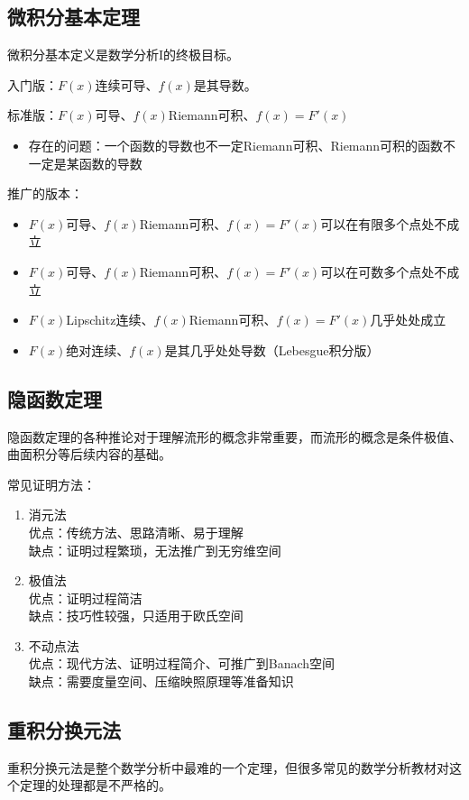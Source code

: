\documentclass[UTF8]{article}
\begin{document}
    \subsection{微积分基本定理}
    微积分基本定义是数学分析I的终极目标。

    入门版：$F(x)$连续可导、$f(x)$是其导数。

    标准版：$F(x)$可导、$f(x)$Riemann可积、$f(x)=F'(x)$
    \begin{itemize}
        \item 存在的问题：一个函数的导数也不一定Riemann可积、Riemann可积的函数不一定是某函数的导数
    \end{itemize}
    推广的版本：\begin{itemize}
        \item $F(x)$可导、$f(x)$Riemann可积、$f(x)=F'(x)$可以在有限多个点处不成立
        \item $F(x)$可导、$f(x)$Riemann可积、$f(x)=F'(x)$可以在可数多个点处不成立
        \item $F(x)$Lipschitz连续、$f(x)$Riemann可积、$f(x)=F'(x)$几乎处处成立
        \item $F(x)$绝对连续、$f(x)$是其几乎处处导数（Lebesgue积分版）
    \end{itemize}
    \subsection{隐函数定理}
    隐函数定理的各种推论对于理解流形的概念非常重要，而流形的概念是条件极值、曲面积分等后续内容的基础。

    常见证明方法：\begin{enumerate}
        \item 消元法\\ 优点：传统方法、思路清晰、易于理解\\ 缺点：证明过程繁琐，无法推广到无穷维空间
        \item 极值法\\ 优点：证明过程简洁\\ 缺点：技巧性较强，只适用于欧氏空间
        \item 不动点法\\ 优点：现代方法、证明过程简介、可推广到Banach空间\\ 缺点：需要度量空间、压缩映照原理等准备知识
    \end{enumerate}
    \subsection{重积分换元法}
    重积分换元法是整个数学分析中最难的一个定理，但很多常见的数学分析教材对这个定理的处理都是不严格的。
\end{document}
